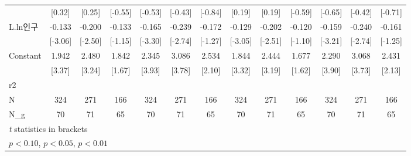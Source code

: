 \begin{table}[htbp]
{\begin{tabular}{l*{12}{c}}
                    &      [0.32]         &      [0.25]         &     [-0.55]         &     [-0.53]         &     [-0.43]         &     [-0.84]         &      [0.19]         &      [0.19]         &     [-0.59]         &     [-0.65]         &     [-0.42]         &     [-0.71]         \\
\addlinespace
L.ln인구            &      -0.133\sym{***}&      -0.200\sym{**} &      -0.133         &      -0.165\sym{***}&      -0.239\sym{***}&      -0.172         &      -0.129\sym{***}&      -0.202\sym{**} &      -0.120         &      -0.159\sym{***}&      -0.240\sym{***}&      -0.161         \\
                    &     [-3.06]         &     [-2.50]         &     [-1.15]         &     [-3.30]         &     [-2.74]         &     [-1.27]         &     [-3.05]         &     [-2.51]         &     [-1.10]         &     [-3.21]         &     [-2.74]         &     [-1.25]         \\
\addlinespace
Constant            &       1.942\sym{***}&       2.480\sym{***}&       1.842\sym{*}  &       2.345\sym{***}&       3.086\sym{***}&       2.534\sym{**} &       1.844\sym{***}&       2.444\sym{***}&       1.677         &       2.290\sym{***}&       3.068\sym{***}&       2.431\sym{**} \\
                    &      [3.37]         &      [3.24]         &      [1.67]         &      [3.93]         &      [3.78]         &      [2.10]         &      [3.32]         &      [3.19]         &      [1.62]         &      [3.90]         &      [3.73]         &      [2.13]         \\
\midrule
r2                  &                     &                     &                     &                     &                     &                     &                     &                     &                     &                     &                     &                     \\
N                   &         324         &         271         &         166         &         324         &         271         &         166         &         324         &         271         &         166         &         324         &         271         &         166         \\
N\_g                 &          70         &          71         &          65         &          70         &          71         &          65         &          70         &          71         &          65         &          70         &          71         &          65         \\
\bottomrule
\multicolumn{13}{l}{\footnotesize \textit{t} statistics in brackets}\\
\multicolumn{13}{l}{\footnotesize \sym{*} \(p<0.10\), \sym{**} \(p<0.05\), \sym{***} \(p<0.01\)}\\
\end{tabular}}
\end{table}
